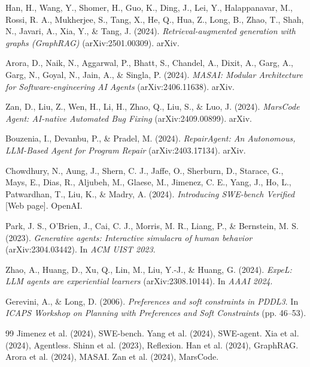 \documentclass{article}
\begin{document}
Han, H., Wang, Y., Shomer, H., Guo, K., Ding, J., Lei, Y., Halappanavar, M., Rossi, R. A., Mukherjee, S., Tang, X., He, Q., Hua, Z., Long, B., Zhao, T., Shah, N., Javari, A., Xia, Y., \& Tang, J. (2024). \textit{Retrieval-augmented generation with graphs (GraphRAG)} (arXiv:2501.00309). arXiv.

Arora, D., Naik, N., Aggarwal, P., Bhatt, S., Chandel, A., Dixit, A., Garg, A., Garg, N., Goyal, N., Jain, A., \& Singla, P. (2024). \textit{MASAI: Modular Architecture for Software-engineering AI Agents} (arXiv:2406.11638). arXiv.

Zan, D., Liu, Z., Wen, H., Li, H., Zhao, Q., Liu, S., \& Luo, J. (2024). \textit{MarsCode Agent: AI-native Automated Bug Fixing} (arXiv:2409.00899). arXiv.

Bouzenia, I., Devanbu, P., \& Pradel, M. (2024). \textit{RepairAgent: An Autonomous, LLM-Based Agent for Program Repair} (arXiv:2403.17134). arXiv.

Chowdhury, N., Aung, J., Shern, C. J., Jaffe, O., Sherburn, D., Starace, G., Mays, E., Dias, R., Aljubeh, M., Glaese, M., Jimenez, C. E., Yang, J., Ho, L., Patwardhan, T., Liu, K., \& Madry, A. (2024). \textit{Introducing SWE-bench Verified} [Web page]. OpenAI.

Park, J. S., O'Brien, J., Cai, C. J., Morris, M. R., Liang, P., \& Bernstein, M. S. (2023). \textit{Generative agents: Interactive simulacra of human behavior} (arXiv:2304.03442). In \textit{ACM UIST 2023}.

Zhao, A., Huang, D., Xu, Q., Lin, M., Liu, Y.-J., \& Huang, G. (2024). \textit{ExpeL: LLM agents are experiential learners} (arXiv:2308.10144). In \textit{AAAI 2024}.

Gerevini, A., \& Long, D. (2006). \textit{Preferences and soft constraints in PDDL3}. In \textit{ICAPS Workshop on Planning with Preferences and Soft Constraints} (pp. 46--53).

\begin{thebibliography}{99}
 Jimenez et al. (2024), SWE-bench.
 Yang et al. (2024), SWE-agent.
 Xia et al. (2024), Agentless.
 Shinn et al. (2023), Reflexion.
 Han et al. (2024), GraphRAG.
 Arora et al. (2024), MASAI.
 Zan et al. (2024), MarsCode.
\end{thebibliography}
\end{document}
